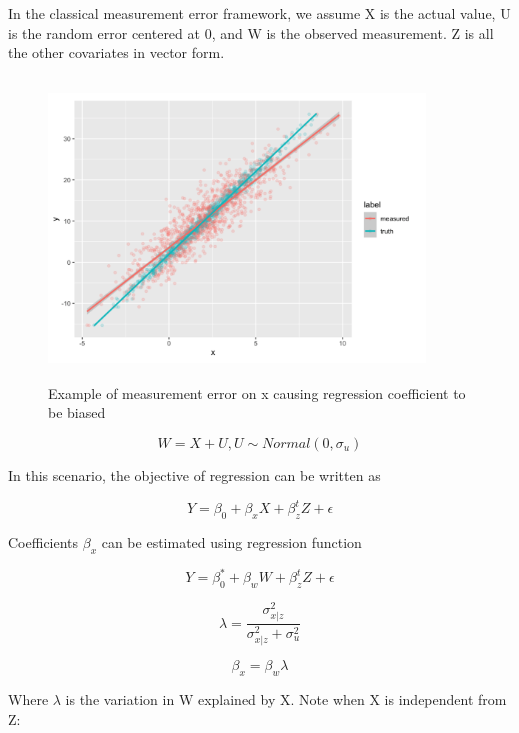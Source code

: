 \documentclass{article}
\begin{document}
In the classical measurement error framework, we assume X is the actual value, U is the random error centered at 0, and W is the observed measurement. Z is all the other covariates in vector form. 

\begin{figure}[h]
\centering
\includegraphics[width = 10cm,height = 8cm]{figure-1.png}
\caption{Example of measurement error on x causing regression coefficient to be biased}
\label{fig1}
\end{figure}


\begin{equation}
W = X + U, U \sim Normal(0, \sigma_u)
\end{equation}

In this scenario, the objective of regression can be written as

\begin{equation}
Y = \beta_0 + \beta_x  X + \beta_{z}^tZ + \epsilon
\end{equation}

Coefficients $\beta_x$ can be estimated using regression function

\begin{equation}
Y = \beta_0^* + \beta_{w}  W + \beta_{z}^tZ + \epsilon
\end{equation}

\begin{equation}
\lambda = \frac{\sigma_{x|z}^2}{\sigma_{x|z}^2 + \sigma_{u}^2}
\end{equation}


\begin{equation}
\beta_x = \beta_{w} \lambda
\end{equation}



Where $\lambda$ is the variation in W explained by X. Note when X is independent from Z:
 
\end{document}
